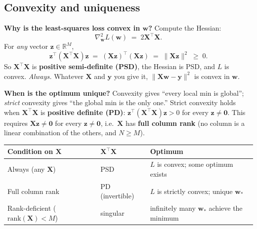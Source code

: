 \documentclass[11pt, a4paper]{article}
\newcommand{\thead}[1]{\textbf{#1}}
\begin{document}
\subsection{Convexity and uniqueness}

\textbf{Why is the least-squares loss convex in $\mathbf{w}$?} Compute the Hessian:
\[
\nabla^2_\mathbf{w} L(\mathbf{w}) \;=\; 2\mathbf{X}^\top\mathbf{X}.
\]
For \emph{any} vector $\mathbf{z}\in\mathbb{R}^M$,
\[
\mathbf{z}^\top(\mathbf{X}^\top\mathbf{X})\mathbf{z} \;=\; (\mathbf{X}\mathbf{z})^\top(\mathbf{X}\mathbf{z}) \;=\; \|\mathbf{X}\mathbf{z}\|^2 \;\ge\; 0.
\]
So $\mathbf{X}^\top\mathbf{X}$ is \textbf{positive semi-definite (PSD)}, the Hessian is PSD, and $L$ is convex. \emph{Always.} Whatever $\mathbf{X}$ and $\mathbf{y}$ you give it, $\|\mathbf{X}\mathbf{w}-\mathbf{y}\|^2$ is convex in $\mathbf{w}$.

\textbf{When is the optimum unique?} Convexity gives ``every local min is global''; \emph{strict} convexity gives ``the global min is the only one.'' Strict convexity holds when $\mathbf{X}^\top\mathbf{X}$ is \textbf{positive definite (PD)}: $\mathbf{z}^\top(\mathbf{X}^\top\mathbf{X})\mathbf{z} > 0$ for every $\mathbf{z}\ne\mathbf{0}$. This requires $\mathbf{X}\mathbf{z} \ne \mathbf{0}$ for every $\mathbf{z}\ne\mathbf{0}$, i.e.\ $\mathbf{X}$ has \textbf{full column rank} (no column is a linear combination of the others, and $N \ge M$).

\begin{tabularx}{\linewidth}{@{}lXX@{}}
\toprule
\thead{Condition on $\mathbf{X}$} & \thead{$\mathbf{X}^\top\mathbf{X}$} & \thead{Optimum} \\
\midrule
Always (any $\mathbf{X}$) & PSD & $L$ is convex; some optimum exists \\
Full column rank & PD (invertible) & $L$ is strictly convex; unique $\mathbf{w}_*$ \\
Rank-deficient ($\text{rank}(\mathbf{X}) < M$) & singular & infinitely many $\mathbf{w}_*$ achieve the minimum \\
\bottomrule
\end{tabularx}
\end{document}
